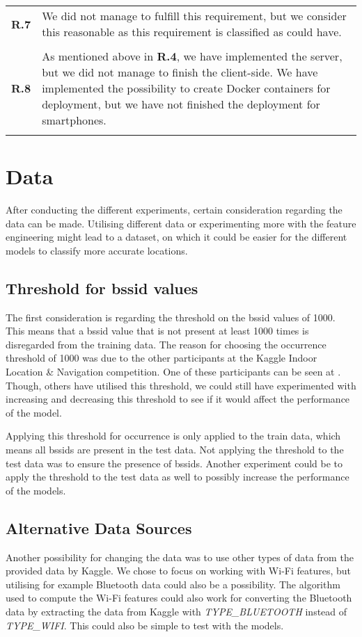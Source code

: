 \begin{longtable}{p{} p{}}
\textbf{R.7} & We did not manage to fulfill this requirement, but we consider this reasonable as this requirement is classified as could have. 
\\\\

\textbf{R.8} & As mentioned above in \textbf{R.4}, we have implemented the server, but we did not manage to finish the client-side. We have implemented the possibility to create Docker containers for deployment, but we have not finished the deployment for smartphones. 
\\\\

\end{longtable}
\vspace{-24pt}

\section{Data}
After conducting the different experiments, certain consideration regarding the data can be made. Utilising different data or experimenting more with the feature engineering might lead to a dataset, on which it could be easier for the different models to classify more accurate locations.

\subsection{Threshold for \gls{bssid} values}
The first consideration is regarding the threshold on the \gls{bssid} values of 1000. This means that a \gls{bssid} value that is not present at least 1000 times is disregarded from the training data. The reason for choosing the occurrence threshold of 1000 was due to the other participants at the Kaggle Indoor Location \& Navigation competition. One of these participants can be seen at \cite{BSSID1000}. Though, others have utilised this threshold, we could still have experimented with increasing and decreasing this threshold to see if it would affect the performance of the model.

Applying this threshold for occurrence is only applied to the train data, which means all \gls{bssid}s are present in the test data. Not applying the threshold to the test data was to ensure the presence of \gls{bssid}s. Another experiment could be to apply the threshold to the test data as well to possibly increase the performance of the models.

\subsection{Alternative Data Sources}
Another possibility for changing the data was to use other types of data from the provided data by Kaggle. We chose to focus on working with Wi-Fi features, but utilising for example Bluetooth data could also be a possibility. The algorithm used to compute the Wi-Fi features could also work for converting the Bluetooth data by extracting the data from Kaggle with \textit{TYPE\_BLUETOOTH} instead of \textit{TYPE\_WIFI}. This could also be simple to test with the models.

